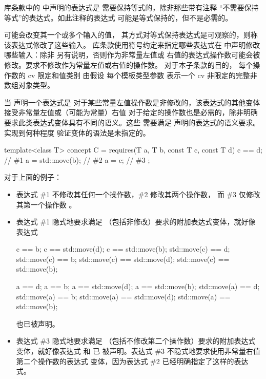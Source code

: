 \pnum
库条款中的  中声明的表达式是
需要保持等式的，除非那些带有注释
“不需要保持等式”的表达式。如此注释的表达式
可能是等式保持的，但不是必需的。

\pnum
可能会改变其一个或多个输入的值，
其方式对等式保持表达式是可观察的，则称该表达式修改了这些输入。
库条款使用符号约定来指定哪些表达式在
 中声明修改哪些输入：除非
另有说明，否则作为非常量左值或
右值的表达式操作数可能会被修改。要求不修改作为常量左值或右值的操作数。
对于本子条款的目的，
每个操作数的 cv 限定和值类别
由假设
每个模板类型参数
表示一个 cv 非限定的完整非数组对象类型。

\pnum
当  声明一个表达式是
对于某些常量左值操作数是非修改的，该表达式的其他变体接受非常量左值或（可能为常量）右值
对于给定的操作数也是必需的，除非明确要求此类表达式变体具有不同的语义。这些
 需要满足
声明的表达式的语义要求。实现到何种程度
验证变体的语法是未指定的。

\pnum
\begin{example}
\begin{codeblock}
template<class T> concept C = requires(T a, T b, const T c, const T d) {
  c == d;           // \#1
  a = std::move(b); // \#2
  a = c;            // \#3
};
\end{codeblock}

对于上面的例子：
\begin{itemize}
\item
表达式 \#1 不修改其任何一个操作数，\#2 修改其两个操作数，
而 \#3 仅修改其第一个操作数 。

\item
表达式 \#1 隐式地要求满足
（包括非修改）要求的附加表达式变体，就好像
表达式
\begin{codeblock}
                                            c  ==           b;
          c  == std::move(d);               c  == std::move(b);
std::move(c) ==           d;      std::move(c) ==           b;
std::move(c) == std::move(d);     std::move(c) == std::move(b);

          a  ==           d;                a  ==           b;
          a  == std::move(d);               a  == std::move(b);
std::move(a) ==           d;      std::move(a) ==           b;
std::move(a) == std::move(d);     std::move(a) == std::move(b);
\end{codeblock}
也已被声明。

\item
表达式 \#3 隐式地要求满足
（包括不修改第二个操作数）要求的附加表达式变体，就好像表达式  和  已
被声明。表达式 \#3 不隐式地要求使用非常量右值第二个操作数的表达式
变体，因为表达式 \#2 已经明确指定了这样的表达式。
\end{itemize}
\end{example}

